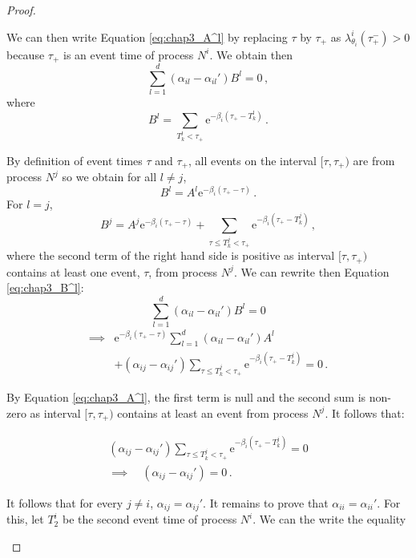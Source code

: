\begin{subappendices}
\begin{proof}
\begin{itemize}
      We can then write Equation \eqref{eq:chap3_A^l} by replacing $\tau$ by $\tau_+$ as $\lambda_{\theta_i}^i(\tau_+^-) > 0$ because $\tau_+$ is an event time of process $N^i$.  We obtain then
      \begin{equation}\label{eq:chap3_B^l}
          \sum_{l=1}^{d}{(\alpha_{il} - \alpha_{il}')B^l} = 0\,,
      \end{equation}
      where \[B^l = \sum_{T_k^l < \tau_+}{\mathrm{e}^{-\beta_i(\tau_+ - T_k^l)}}\,.\]
      
     By definition of event times $\tau$ and $\tau_+$, all events on the interval $[\tau, \tau_+)$ are from process $N^j$ so we obtain for all $l \neq j$, \[B^l = A^l \mathrm{e}^{-\beta_i(\tau_+ - \tau)}\,.\] 
      For $l=j$, 
      \[B^j = A^j\mathrm{e}^{-\beta_i(\tau_+ - \tau)} + \sum_{\tau \leq T_k^j < \tau_+}{\mathrm{e}^{-\beta_i(\tau_+ - T_k^j)}}\,,\] 
      where the second term of the right hand side is positive as interval $[\tau, \tau_+)$ contains at least one event, $\tau$, from process $N^j$. 
      We can rewrite then Equation \eqref{eq:chap3_B^l}:
      \begin{equation*}
      \sum_{l=1}^{d}{(\alpha_{il} - \alpha_{il}')B^l} = 0
      \end{equation*}
      \begin{align*}
      \implies &\mathrm{e}^{-\beta_i(\tau_+ - \tau)}\sum_{l=1}^{d}{(\alpha_{il} - \alpha_{il}')A^l} \\
      &+ (\alpha_{ij}-\alpha_{ij}')\sum_{\tau \leq T_k^j < \tau_+}{\mathrm{e}^{-\beta_i(\tau_+ - T_k^j)}} = 0\,.
      \end{align*}
          
      By Equation \eqref{eq:chap3_A^l}, the first term is null and the second sum is non-zero as interval $[\tau, \tau_+)$ contains at least an event from process $N^j$. It follows that:
      
      \begin{gather*}
          (\alpha_{ij}-\alpha_{ij}')\sum_{\tau \leq T_k^j < \tau_+}{\mathrm{e}^{-\beta_i(\tau_+ - T_k^j)}} = 0\\
          \implies \quad (\alpha_{ij}-\alpha_{ij}') = 0\,.
      \end{gather*}
      
      It follows that for every $j\neq i$, $\alpha_{ij}=\alpha_{ij}'$. It remains to prove that $\alpha_{ii}=\alpha_{ii}'$. For this, let $T^i_2$ be the second event time of process $N^i$. We can the write the equality 
      

\end{itemize}
\end{proof}
\end{subappendices}

